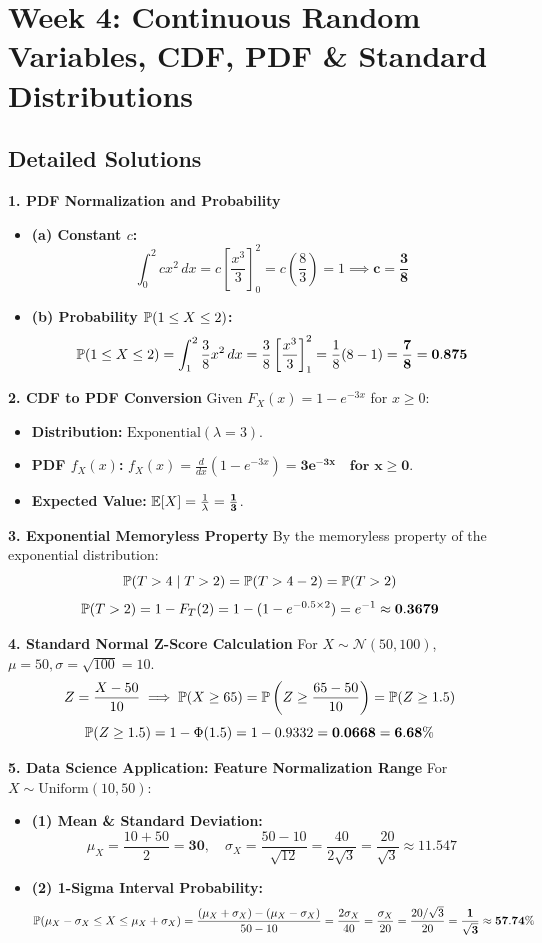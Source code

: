 \section*{Week 4: Continuous Random Variables, CDF, PDF \& Standard Distributions}

\subsection*{Detailed Solutions}

\textbf{1. PDF Normalization and Probability}
\begin{itemize}
    \item \textbf{(a) Constant $c$:}
    $$\int_0^2 c x^2 \, dx = c \left[ \frac{x^3}{3} \right]_0^2 = c \left( \frac{8}{3} \right) = 1 \implies \mathbf{c = \frac{3}{8}}$$
    \item \textbf{(b) Probability $\P(1 \le X \le 2)$:}
    $$\P(1 \le X \le 2) = \int_1^2 \frac{3}{8} x^2 \, dx = \frac{3}{8} \left[ \frac{x^3}{3} \right]_1^2 = \frac{1}{8} (8 - 1) = \mathbf{\frac{7}{8} = 0.875}$$
\end{itemize}

\textbf{2. CDF to PDF Conversion}
Given $F_X(x) = 1 - e^{-3x}$ for $x \ge 0$:
\begin{itemize}
    \item \textbf{Distribution:} $\text{Exponential}(\lambda = 3)$.
    \item \textbf{PDF $f_X(x)$:} $f_X(x) = \frac{d}{dx} (1 - e^{-3x}) = \mathbf{3 e^{-3x} \quad \text{for } x \ge 0}$.
    \item \textbf{Expected Value:} $\E[X] = \frac{1}{\lambda} = \mathbf{\frac{1}{3}}$.

\end{itemize}
\textbf{3. Exponential Memoryless Property}
By the memoryless property of the exponential distribution:
$$\P(T > 4 \mid T > 2) = \P(T > 4 - 2) = \P(T > 2)$$
$$\P(T > 2) = 1 - F_T(2) = 1 - (1 - e^{-0.5 \times 2}) = e^{-1} \approx \mathbf{0.3679}$$

\textbf{4. Standard Normal Z-Score Calculation}
For $X \sim \mathcal{N}(50, 100)$, $\mu = 50, \sigma = \sqrt{100} = 10$.
$$Z = \frac{X - 50}{10} \implies \P(X \ge 65) = \P\left(Z \ge \frac{65 - 50}{10}\right) = \P(Z \ge 1.5)$$
$$\P(Z \ge 1.5) = 1 - \Phi(1.5) = 1 - 0.9332 = \mathbf{0.0668 = 6.68\%}$$

\textbf{5. Data Science Application: Feature Normalization Range}
For $X \sim \text{Uniform}(10, 50)$:
\begin{itemize}
    \item \textbf{(1) Mean \& Standard Deviation:}
    $$\mu_X = \frac{10 + 50}{2} = \mathbf{30}, \quad \sigma_X = \frac{50 - 10}{\sqrt{12}} = \frac{40}{2\sqrt{3}} = \frac{20}{\sqrt{3}} \approx \mathbf{11.547}$$
    \item \textbf{(2) 1-Sigma Interval Probability:}
    $$\P(\mu_X - \sigma_X \le X \le \mu_X + \sigma_X) = \frac{(\mu_X + \sigma_X) - (\mu_X - \sigma_X)}{50 - 10} = \frac{2 \sigma_X}{40} = \frac{\sigma_X}{20} = \frac{20/\sqrt{3}}{20} = \mathbf{\frac{1}{\sqrt{3}} \approx 57.74\%}$$
\end{itemize}

